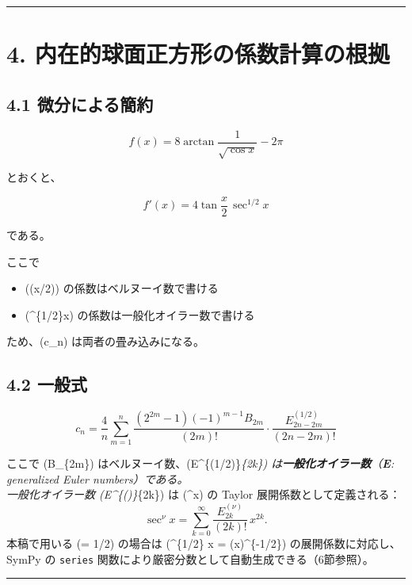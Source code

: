 \documentclass[
  12pt,
  a4paper,
]{article}
\providecommand{\tightlist}{%
  \setlength{\itemsep}{0pt}\setlength{\parskip}{0pt}}
\begin{document}
\begin{center}\rule{0.5\linewidth}{0.5pt}\end{center}

\section{4.
内在的球面正方形の係数計算の根拠}\label{ux5185ux5728ux7684ux7403ux9762ux6b63ux65b9ux5f62ux306eux4fc2ux6570ux8a08ux7b97ux306eux6839ux62e0}

\subsection{4.1
微分による簡約}\label{ux5faeux5206ux306bux3088ux308bux7c21ux7d04}

\[
f(x)=8\arctan\frac{1}{\sqrt{\cos x}}-2\pi
\]

とおくと、

\[
f'(x)=4\tan\frac{x}{2}\,\sec^{1/2}x
\]

である。

ここで

\begin{itemize}
\tightlist
\item
  (\tan(x/2)) の係数はベルヌーイ数で書ける
\item
  (\sec\^{}\{1/2\}x) の係数は一般化オイラー数で書ける
\end{itemize}

ため、(c\_n) は両者の畳み込みになる。

\subsection{4.2 一般式}\label{ux4e00ux822cux5f0f}

\[
\boxed{
c_n =
\frac{4}{n}
\sum_{m=1}^n
\frac{(2^{2m}-1)(-1)^{m-1}B_{2m}}{(2m)!}
\cdot
\frac{E^{(1/2)}_{2n-2m}}{(2n-2m)!}
}
\]

ここで (B\_\{2m\}) はベルヌーイ数、(E\^{}\{(1/2)\}\emph{\{2k\})
は\textbf{一般化オイラー数}（\textbf{E}: generalized Euler
numbers）である。\\
一般化オイラー数 (E\^{}\{(\nu)\}}\{2k\}) は (\sec\^{}\nu x) の Taylor
展開係数として定義される： \[
\sec^\nu x = \sum_{k=0}^\infty \frac{E^{(\nu)}_{2k}}{(2k)!}\,x^{2k}.
\] 本稿で用いる (\nu = 1/2) の場合は (\sec\^{}\{1/2\} x =
(\cos x)\^{}\{-1/2\}) の展開係数に対応し、\\
SymPy の \texttt{series}
関数により厳密分数として自動生成できる（6節参照）。

\begin{center}\rule{0.5\linewidth}{0.5pt}\end{center}
\end{document}

